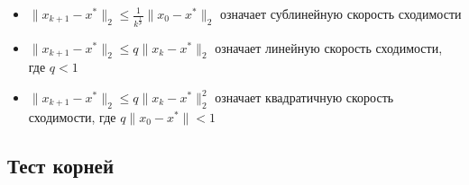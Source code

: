\documentclass[
  russian,
  letterpaper,
  DIV=11,
  numbers=noendperiod]{scrartcl}
\providecommand{\tightlist}{%
  \setlength{\itemsep}{0pt}\setlength{\parskip}{0pt}}
\begin{document}
\begin{itemize}
\tightlist
\item
  \(\|x_{k+1} - x^*\|_2 \leq \frac{1}{k^{\frac1p}} \|x_0 - x^*\|_2\)
  означает сублинейную скорость сходимости
\item
  \(\|x_{k+1} - x^*\|_2 \leq q \|x_k - x^*\|_2\) означает линейную
  скорость сходимости, где \(q<1\)
\item
  \(\|x_{k+1} - x^*\|_2 \leq q \|x_k - x^*\|_2^2\) означает квадратичную
  скорость сходимости, где \(q\|x_0 - x^*\|<1\)
\end{itemize}

\subsection{Тест
корней}\label{ux442ux435ux441ux442-ux43aux43eux440ux43dux435ux439}
\end{document}
